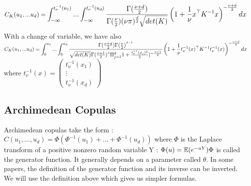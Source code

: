 \documentclass{article}
\begin{document}
	
	\begin{equation*}
	 C_{K}(u_{1},...u_{d})= \mathlarger{ \int_{-\infty}^{t_\nu^{-1}(u_{1})}...\int_{-\infty}^{t_\nu^{-1}(u_{d})} \frac{\Gamma (\frac{\nu +d}{2})}{\Gamma
	 (\frac{\nu}{2})(\nu \pi)^{\frac{d}{2}}\sqrt{det(K)}}\left(1+\frac{1}{\nu}x^\top K^{-1} x \right)^{-\frac{\nu +d}{2}}dx}
	\end{equation*}
	\newline
	\newline
	With a change of variable, we have also \newline
	\newline
	\begin{math}
	C_{K}(u_{1},...u_{d})=  \mathlarger{ \int_{0}^{u_{1}}...\int_{0}^{u_{d}} \frac{\Gamma (\frac{\nu +d}{2}) \Gamma (\frac{\nu}{2})^{^{d-1}}}{\sqrt{det(K)}\Gamma (\frac{\nu +1}{2})^{^{d}}\Pi_{j=1}^d 1+\frac{t_\nu^{-1}(x_j)^2}{2})^{-\frac{\nu+1}{2}}}\left(1+\frac{1}{\nu}t_\nu^{-1}(x)^\top K^{-1} t_\nu^{-1}(x) \right)^{-\frac{\nu +d}{2}}dx}
	\end{math}
	\newline
	\newline
	\newline
	where \begin{math} t_\nu^{-1}(x) =  \begin{pmatrix}
   t_\nu^{-1}(x_{1}) \\
  \vdots   \\
   t_\nu^{-1}(x_{d})  
 \end{pmatrix}\end{math}

	 

   \subsection{Archimedean Copulas}
   Archimedean copulas take the form :
   \newline
   \newline
   \begin{math}
   C(u_{1},...,u_{d})= \Phi(\Phi^{-1}(u_{1})+...+\Phi^{-1}(u_{d}))
   \end{math}
   \newline
   \newline
   where \begin{math} \Phi \end{math} is the Laplace transform of a positive nonzero random variable Y :
	\begin{math} \Phi (u)=\mathbb{E}(e^{-uY})
	\newline
	\newline
	\Phi \end{math} is called the generator function.
	\newline
	It generally depends on a parameter called \begin{math} \theta \end{math}.
	\newline
	In some papers, the definition of the generator function and its inverse can be inverted. We will use the definition above which gives us simpler formulas.
	\newline
	
\end{document}
